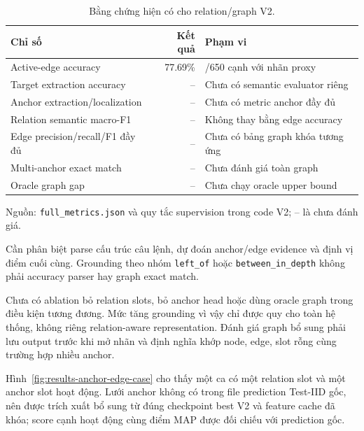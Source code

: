 \begin{table}[htbp]
    \centering
    \setlength{\tabcolsep}{4pt}
    \renewcommand{\arraystretch}{1.15}
    \caption{Bằng chứng hiện có cho relation/graph V2.}
    \label{tab:results-graph-evidence}
    \small
    \begin{tabularx}{\textwidth}{@{}>{\raggedright\arraybackslash}p{}r>{\raggedright\arraybackslash}X@{}}
        \toprule
        Chỉ số & Kết quả & Phạm vi \\
        \midrule
        Active-edge accuracy & 77.69\% & 505/650 cạnh với nhãn proxy \\
        Target extraction accuracy & -- & Chưa có semantic evaluator riêng \\
        Anchor extraction/localization & -- & Chưa có metric anchor đầy đủ \\
        Relation semantic macro-F1 & -- & Không thay bằng edge accuracy \\
        Edge precision/recall/F1 đầy đủ & -- & Chưa có bảng graph khóa tương ứng \\
        Multi-anchor exact match & -- & Chưa đánh giá toàn graph \\
        Oracle graph gap & -- & Chưa chạy oracle upper bound \\
        \bottomrule
    \end{tabularx}
    \vspace{2pt}
    {\footnotesize\raggedright Nguồn: \texttt{full\_\allowbreak metrics.json} và
    quy tắc supervision trong code V2; -- là chưa đánh giá.\par}
\end{table}

Cần phân biệt parse cấu trúc câu lệnh, dự đoán
anchor/edge evidence và định vị điểm cuối cùng.
Grounding theo nhóm \texttt{left\_\allowbreak of} hoặc
\texttt{between\_\allowbreak in\_\allowbreak depth} không phải accuracy parser
hay graph exact match.

Chưa có ablation bỏ relation slots, bỏ anchor head
hoặc dùng oracle graph trong điều kiện tương đương.
Mức tăng grounding vì vậy chỉ được quy cho toàn hệ
thống, không riêng relation-aware representation.
Đánh giá graph bổ sung phải lưu output trước khi
mở nhãn và định nghĩa khớp node, edge, slot rỗng cùng
trường hợp nhiều anchor.

Hình~\ref{fig:results-anchor-edge-case} cho thấy một ca có một
relation slot và một anchor slot hoạt động. Lưới anchor không có
trong file prediction Test-IID gốc, nên được trích xuất bổ sung
từ đúng checkpoint best V2 và feature cache đã khóa; score cạnh
hoạt động cùng điểm MAP được đối chiếu với prediction gốc.

